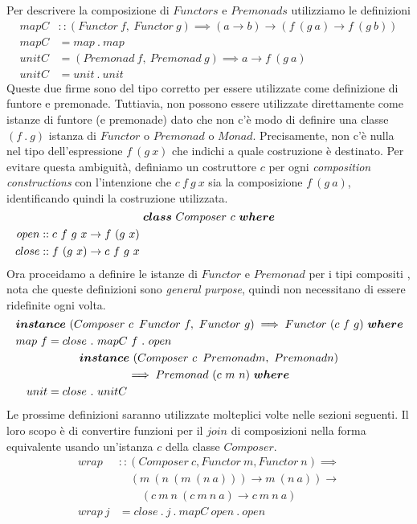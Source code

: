 Per descrivere la composizione di $Functors$ e $Premonads$ utilizziamo le
definizioni
\begin{align*}
  mapC &:: (Functor\ f,\ Functor\ g) \implies (a \to b) \to
  (f \ (g \ a) \to f\ (g\ b))\\
  mapC &= map\ .\ map\\
  unitC &= (Premonad\ f,\ Premonad\ g) \implies a \to f\ (g\ a)\\
  unitC &= unit\ .\ unit
\end{align*}
Queste due firme sono del tipo corretto per essere utilizzate come definizione
di funtore e premonade.
Tuttiavia, non possono essere utilizzate direttamente come istanze di funtore (e
premonade) dato che non c'è modo di definire una classe $(f\ .\ g)$ istanza
di $Functor$ o $Premonad$ o $Monad$.
Precisamente, non c'è nulla nel tipo dell'espressione $f\ (g\ x)$ che indichi
a quale costruzione è destinato.
Per evitare questa ambiguità, definiamo un costruttore $c$ per ogni
\textit{composition constructions} con l'intenzione che $c\ f\ g\ x$ sia la
composizione $f\ (g\ a)$, identificando quindi la costruzione utilizzata.
\label{composer}
\begin{align*}
  \classdef{\bm{class}\ Composer\ c\ \bm{where}}
  open &:: c\ f\ g\ x \to f\ (g\ x)\\
  close &:: f\ (g\ x) \to c\ f\ g\ x
\end{align*}
Ora proceidamo a definire le istanze di $Functor$ e $Premonad$ per i tipi compositi
, nota che queste definizioni sono \textit{general purpose}, quindi non necessitano di essere
ridefinite ogni volta.
\begin{align*}
  \classdef{\bm{instance}\ (Composer\ c\,\ Functor\ f,\ Functor\ g) \implies Functor\ (c\ f\ g)\  \bm{where}}
  map\ f &= close\ .\ mapC\ f\ .\ open\\
  \classdef{\bm{instance}\ (Composer\ c\,\ Premonad m,\ Premonad n)}
  \classdef{\implies Premonad\ (c\ m\ n)\  \bm{where}}
  unit &= close\ .\ unitC
\end{align*}
Le prossime definizioni saranno utilizzate molteplici volte nelle sezioni
seguenti.
Il loro scopo è di convertire funzioni per il $join$ di composizioni nella forma
equivalente usando un'istanza $c$ della classe $Composer$.
\begin{align*}
  wrap &:: (Composer\ c, Functor\ m, Functor\ n) \implies\\
       &\quad (m\ (n\ (m\ (n\ a))) \to m\ (n\ a)) \to\\
       &\qquad (c\ m\ n\ (c\ m\ n\ a) \to c\ m\ n\ a)\\
  wrap\ j &= close\ .\ j\ .\ mapC\ open\ .\ open
\end{align*}
